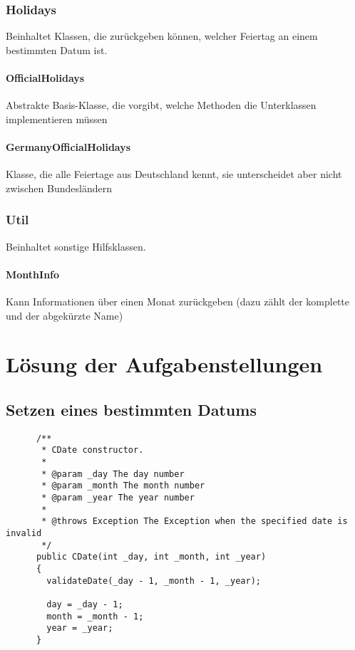\documentclass[12pt,pdftex,parskip=half]{scrartcl}
\begin{document}
      \clearpage


      \subsubsection{Holidays}
      Beinhaltet Klassen, die zurückgeben können, welcher Feiertag an einem bestimmten Datum ist.

        \paragraph{OfficialHolidays}
        Abstrakte Basis-Klasse, die vorgibt, welche Methoden die Unterklassen implementieren müssen

        \paragraph{GermanyOfficialHolidays}
        Klasse, die alle Feiertage aus Deutschland kennt, sie unterscheidet aber nicht zwischen Bundesländern

      \subsubsection{Util}
      Beinhaltet sonstige Hilfsklassen.

        \paragraph{MonthInfo}
        Kann Informationen über einen Monat zurückgeben (dazu zählt der komplette und der abgekürzte Name)

  \clearpage


\section{Lösung der Aufgabenstellungen}

  \subsection{Setzen eines bestimmten Datums}

  \begin{lstlisting}
      /**
       * CDate constructor.
       *
       * @param _day The day number
       * @param _month The month number
       * @param _year The year number
       *
       * @throws Exception The Exception when the specified date is invalid
       */
      public CDate(int _day, int _month, int _year)
      {
        validateDate(_day - 1, _month - 1, _year);

        day = _day - 1;
        month = _month - 1;
        year = _year;
      }
  \end{lstlisting}
\end{document}
